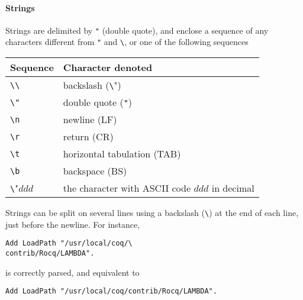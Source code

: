 \paragraph{Strings}
Strings are delimited by \verb!"! (double quote), and enclose a
sequence of any characters different from \verb!"! and \verb!\!, or
one of the following sequences
\begin{center}
\begin{tabular}{|l|l|}
\hline
Sequence        & Character denoted \\
\hline
\verb"\\"       & backslash (\verb"\") \\
\verb'\"'       & double quote (\verb'"') \\
\verb"\n"       & newline (LF) \\
\verb"\r"       & return (CR) \\
\verb"\t"       & horizontal tabulation (TAB) \\
\verb"\b"       & backspace (BS) \\
\verb"\"$ddd$  & the character with ASCII code $ddd$ in decimal \\
\hline
\end{tabular}
\end{center}
Strings can be split on several lines using a backslash (\verb!\!)  at
the end of each line, just before the newline. For instance,

\begin{flushleft}
\begin{small}
\begin{verbatim}
Add LoadPath "/usr/local/coq/\
contrib/Rocq/LAMBDA".
\end{verbatim}
\end{small}
\end{flushleft}
      
is correctly parsed, and equivalent to

\begin{flushleft}
\begin{small}
\begin{verbatim}
Add LoadPath "/usr/local/coq/contrib/Rocq/LAMBDA".
\end{verbatim}
\end{small}
\end{flushleft}

